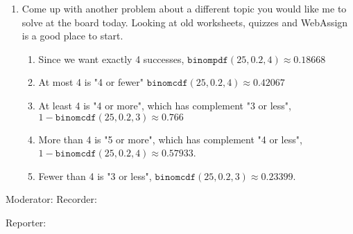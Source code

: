\documentclass{article}
\newcommand{\answer}[1]{\color{red}#1}
\begin{document}
{{{\begin{enumerate}
{\answer Let event A be "male student" and event B "biology major"
    \begin{enumerate}
        \item This is the percentage of biology majors that are males, $45/92$.
        \item This is the percentage of students that are male, biology majors $45/233$.
        \item This is the percentage of students that are either male or not biology majors $186/233$.
        \item This is the percentage of students that are not male (to be interpreted as 'females' I guess) that are biology majors, $47/233$.
    \end{enumerate}}

\item Come up with another problem about a different topic you would like me to solve at the board today. Looking at old worksheets, quizzes and WebAssign is a good place to start. 

{\answer \begin{enumerate}
    \item Since we want exactly 4 successes, $\texttt{binompdf}(25, 0.2, 4) \approx 0.18668$
    \item At most 4 is "4 or fewer" $\texttt{binomcdf}(25,0.2,4) \approx 0.42067$
    \item At least 4 is "4 or more", which has complement "3 or less", $1-\texttt{binomcdf}(25, 0.2, 3) \approx 0.766$
    \item More than 4 is "5 or more", which has complement "4 or less",
    $1-\texttt{binomcdf}(25,0.2,4)\approx 0.57933$.
    \item Fewer than 4 is "3 or less", $\texttt{binomcdf}(25,0.2,3) \approx 0.23399$.
    \end{enumerate}}

\end{enumerate}



\begin{center}
\textbf{}
\end{center}

Moderator:{\underbar{\hspace{2in}}} \hfill  Recorder:{\underbar{\hspace{2in}}}

\bigskip

Reporter:{\underbar{\hspace{2in}}}

}}}
\end{document}
